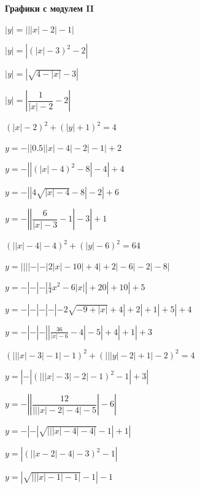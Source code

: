 \centerline{\bf \Huge Графики с модулем II}

 $\left|y\right|=\left|\left|\left|x\right|-2\right|-1\right|$

 $\left|y\right|=\left|\left(\left|x\right|-3\right)^{2}-2\right|$

 $\left|y\right|=\left|\sqrt{4-\left|x\right|}-3\right|$

 $\left|y\right|=\left|\dfrac{1}{\left|x\right|-2}-2\right|$

 $\left(\left|x\right|-2\right)^{2}+\left(\left|y\right|+1\right)^{2}=4$

 $y=-\left|\left|0.5\left|\left|x\right|-4\right|-2\right|-1\right|+2$

 $y=-\left|\left|\left(\left|x\right|-4\right)^{2}-8\right|-4\right|+4$

 $y=-\left|\left|4\sqrt{\left|x\right|-4}-8\right|-2\right|+6$

 $y=-\left|\left|\dfrac{6}{\left|x\right|-3}-1\right|-3\right|+1$

 $\left(\left|\left|x\right|-4\right|-4\right)^{2}+\left(\left|y\right|-6\right)^{2}=64$

 $y=\left|\left|\left|\left|-\left|-\left|2\left|x\right|-10\right|+4\right|+2\right|-6\right|-2\right|-8\right|$

 $y=-\left|-\left|-\left|\frac{1}{4}x^{2}-6\left|x\right|\right|+20\right|+10\right|+5$

 $y=-\left|-\left|-\left|-\left|-2\sqrt{-9+\left|x\right|}+4\right|+2\right|+1\right|+5\right|+4$

 $y=-\left|-\left|-\left|\left|\frac{36}{\left|x\right|-6}-4\right|-5\right|+4\right|+1\right|+3$

 $\left(\left|\left|\left|x\right|-3\right|-1\right|-1\right)^{2}+\left(\left|\left|\left|y\right|-2\right|+1\right|-2\right)^{2}=4$

 $y=\left|-\left|\left(\left|\left|\left|x\right|-3\right|-2\right|-1\right)^{2}-1\right|+3\right|$

 $y=-\left|\left|\dfrac{12}{\left|\left|\left|x\right|-2\right|-4\right|-5}\right|-6\right|$

 $y=-\left|-\left|\sqrt{\left|\left|\left|x\right|-4\right|-4\right|}-1\right|+1\right|$

 $y=\left|\left(\left|\left|x-2\right|-4\right|-3\right)^{2}-1\right|$

 $y=\left|\sqrt{\left|\left|\left|x\right|-1\right|-1\right|}-1\right|-1$